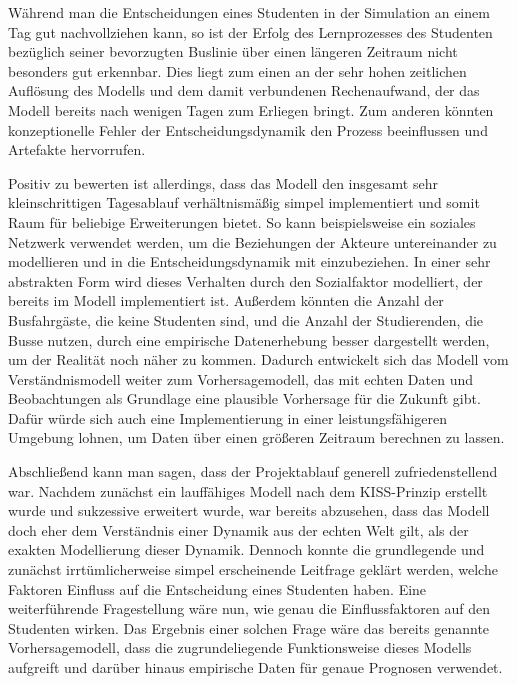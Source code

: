 \documentclass[12pt,a4paper]{scrartcl}
\begin{document}
Während man die Entscheidungen eines Studenten in der Simulation an einem Tag gut nachvollziehen kann, so ist der Erfolg des Lernprozesses des Studenten bezüglich seiner bevorzugten Buslinie über einen längeren Zeitraum nicht besonders gut erkennbar. Dies liegt zum einen an der sehr hohen zeitlichen Auflösung des Modells und dem damit verbundenen Rechenaufwand, der das Modell bereits nach wenigen Tagen zum Erliegen bringt. Zum anderen könnten konzeptionelle Fehler der Entscheidungsdynamik den Prozess beeinflussen und Artefakte hervorrufen. 

Positiv zu bewerten ist allerdings, dass das Modell den insgesamt sehr kleinschrittigen Tagesablauf verhältnismäßig simpel implementiert und somit Raum für beliebige Erweiterungen bietet. So kann beispielsweise ein soziales Netzwerk verwendet werden, um die Beziehungen der Akteure untereinander zu modellieren und in die Entscheidungsdynamik mit einzubeziehen. In einer sehr abstrakten Form wird dieses Verhalten durch den Sozialfaktor modelliert, der bereits im Modell implementiert ist. Außerdem könnten die Anzahl der Busfahrgäste, die keine Studenten sind, und die Anzahl der Studierenden, die Busse nutzen, durch eine empirische Datenerhebung besser dargestellt werden, um der Realität noch näher zu kommen. Dadurch entwickelt sich das Modell vom Verständnismodell weiter zum Vorhersagemodell, das mit echten Daten und Beobachtungen als Grundlage eine plausible Vorhersage für die Zukunft gibt. Dafür würde sich auch eine Implementierung in einer leistungsfähigeren Umgebung lohnen, um Daten über einen größeren Zeitraum berechnen zu lassen. 

Abschließend kann man sagen, dass der Projektablauf generell zufriedenstellend war. Nachdem zunächst ein lauffähiges Modell nach dem KISS-Prinzip erstellt wurde und sukzessive erweitert wurde, war bereits abzusehen, dass das Modell doch eher dem Verständnis einer Dynamik aus der echten Welt gilt, als der exakten Modellierung dieser Dynamik. Dennoch konnte die grundlegende und zunächst irrtümlicherweise simpel erscheinende Leitfrage geklärt werden, welche Faktoren Einfluss auf die Entscheidung eines Studenten haben. 
Eine weiterführende Fragestellung wäre nun, wie genau die Einflussfaktoren auf den Studenten wirken. Das Ergebnis einer solchen Frage wäre das bereits genannte Vorhersagemodell, dass die zugrundeliegende Funktionsweise dieses Modells aufgreift und darüber hinaus empirische Daten für genaue Prognosen verwendet.
\end{document}
